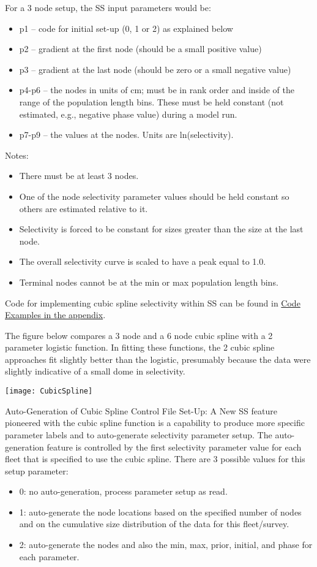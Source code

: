 For a 3 node setup, the SS input parameters would be:
	\begin{itemize}
		\item p1 – 	code for initial set-up (0, 1 or 2) as explained below
		\item p2 – 	gradient at the first node (should be a small positive value)
		\item p3 – 	gradient at the last node (should be zero or a small negative value)
		\item p4-p6 – the nodes in units of cm; must be in rank order and inside of the range of the population length bins.  These must be held constant (not estimated, e.g., negative phase value) during a model run.
		\item  p7-p9 – the values at the nodes. Units are ln(selectivity).
	\end{itemize}

Notes:
	\begin{itemize}
		\item There must be at least 3 nodes.
		\item One of the node selectivity parameter values should be held constant so others are estimated relative to it.
		\item Selectivity is forced to be constant for sizes greater than the size at the last node.
		\item The overall selectivity curve is scaled to have a peak equal to 1.0.
		\item Terminal nodes cannot be at the min or max population length bins.
	\end{itemize}
	
Code for implementing cubic spline selectivity within SS can be found in \hyperlink{CubicSpline}{Code Examples in the appendix}.

The figure below compares a 3 node and a 6 node cubic spline with a 2 parameter logistic function.  In fitting these functions, the 2 cubic spline approaches fit slightly better than the logistic, presumably because the data were slightly indicative of a small dome in selectivity.
	\begin{center}
		\texttt{[image: CubicSpline]}
	\end{center}
	
Auto-Generation of Cubic Spline Control File Set-Up: A New SS feature pioneered with the cubic spline function is a capability to produce more specific parameter labels and to auto-generate selectivity parameter setup.  The auto-generation feature is controlled by the first selectivity parameter value for each fleet that is specified to use the cubic spline.  There are 3 possible values for this setup parameter:
	\begin{itemize}
		\item 0: no auto-generation, process parameter setup as read.
		\item 1: auto-generate the node locations based on the specified number of nodes and on the cumulative size distribution of the data for this fleet/survey.
		\item 2: auto-generate the nodes and also the min, max, prior, initial, and phase for each parameter.
	\end{itemize}
	
